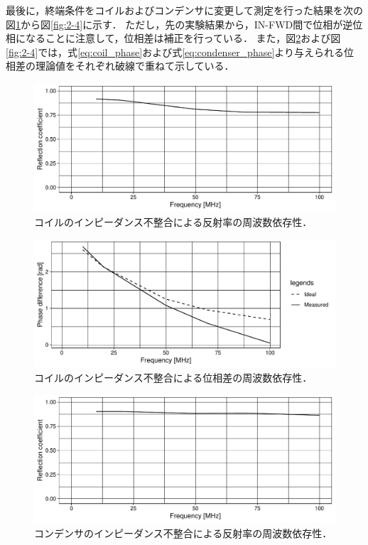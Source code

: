 \documentclass[uplatex,dvipdfmx,a4j,12pt]{jsarticle}
\begin{document}
最後に，終端条件をコイルおよびコンデンサに変更して測定を行った結果を次の図\ref{fig:2-1}から図\ref{fig:2-4}に示す．
ただし，先の実験結果から，IN-FWD間で位相が逆位相になることに注意して，位相差は補正を行っている．
また，図\ref{fig:2-2}および図\ref{fig:2-4}では，式\eqref{eq:coil_phase}および式\eqref{eq:condenser_phase}より与えられる位相差の理論値をそれぞれ破線で重ねて示している．
\begin{figure}[H]
    \centering
    \includegraphics[width=\linewidth]{data/2_1/reflection_vs_freq.pdf}
    \caption{コイルのインピーダンス不整合による反射率の周波数依存性．}
    \label{fig:2-1}
\end{figure}

\begin{figure}[H]
  \centering
  \includegraphics[width=\linewidth]{data/2_1/phase_diff.pdf}
  \caption{コイルのインピーダンス不整合による位相差の周波数依存性．}
  \label{fig:2-2}
\end{figure}

\begin{figure}[H]
  \centering
  \includegraphics[width=\linewidth]{data/2_2/reflection_vs_freq.pdf}
  \caption{コンデンサのインピーダンス不整合による反射率の周波数依存性．}
  \label{fig:2-3}
\end{figure}
\end{document}
